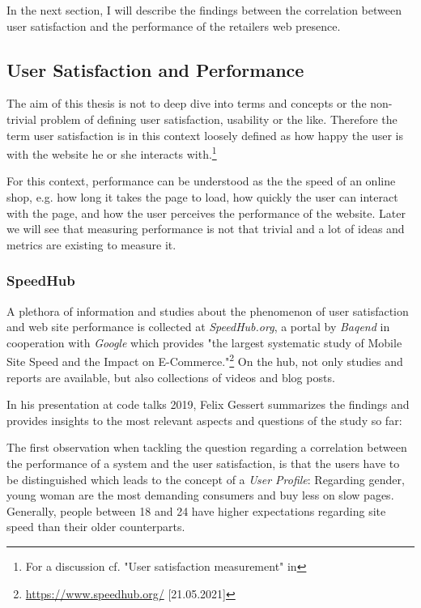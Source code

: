 In the next section, I will describe the findings between the correlation between user satisfaction and the performance of the retailers web presence.





\subsection{User Satisfaction and Performance}

The aim of this thesis is not to deep dive into terms and concepts or the non-trivial problem of defining user satisfaction, usability or the like.
Therefore the term user satisfaction is in this context loosely defined as how happy the user is with the website he or she interacts with.\footnote{For a discussion cf. "User satisfaction measurement" in } %

For this context, performance can be understood as the the speed of an online shop, e.g. how long it takes the page to load, how quickly the user can interact with the page, and how the user perceives the performance of the website.
Later we will see that measuring performance is not that trivial and a lot of ideas and metrics are existing to measure it.


\subsubsection{SpeedHub}

A plethora of information and studies about the phenomenon of user satisfaction and web site performance is collected at \textit{SpeedHub.org}, a portal by \textit{Baqend} in cooperation with \textit{Google} which provides "the largest systematic study of Mobile Site Speed and the Impact on E-Commerce."\footnote{\url{https://www.speedhub.org/} [21.05.2021]}
On the hub, not only studies and reports are available, but also collections of videos and blog posts.

In his presentation at code talks 2019, Felix Gessert summarizes the findings and provides insights to the most relevant aspects and questions of the study so far: %

The first observation when tackling the question regarding a correlation between the performance of a system and the user satisfaction, is that the users have to be distinguished which leads to the concept of a \textit{User Profile}: Regarding gender, young woman are the most demanding consumers and buy less on slow pages.
Generally, people between 18 and 24 have higher expectations regarding site speed than their older counterparts.

